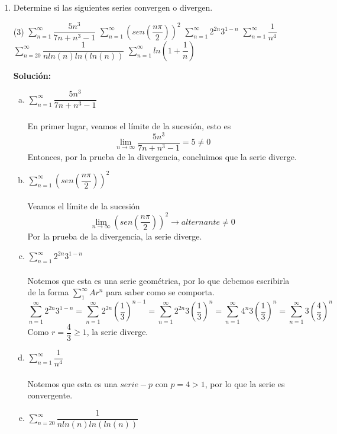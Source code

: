 \documentclass[12pt]{article}
\newenvironment{solucion}
{\begin{mdframed}[backgroundcolor=black!10]
		{\bf Solución:}\\
	}
	{
	\end{mdframed}
}
\newenvironment{preguntas}
{\begin{enumerate}\itemsep12pt
	}
	{
	\end{enumerate}
}
\newcommand{\ra}{\rightarrow}
\begin{document}
\begin{preguntas}
\item Determine si las siguientes series convergen o divergen.
\begin{tasks}(3)
\task $\sum\limits_{n=1}^{\infty}\dfrac{5n^3}{7n+n^3-1}$
\task $\sum\limits_{n=1}^{\infty}\left(sen\left(\dfrac{n\pi}{2}\right)\right)^2$
\task $\sum\limits_{n=1}^{\infty}2^{2n}3^{1-n}$
\task $\sum\limits_{n=1}^{\infty}\dfrac{1}{n^4}$
\task $\sum\limits_{n=20}^{\infty}\dfrac{1}{nln(n)ln(ln(n))}$
\task $\sum\limits_{n=1}^{\infty}ln\left(1+\dfrac{1}{n}\right)$
\end{tasks}
\begin{solucion}

\begin{enumerate}[a)]
\item $\sum\limits_{n=1}^{\infty}\dfrac{5n^3}{7n+n^3-1}$\\
			\\
			En primer lugar, veamos el límite de la sucesión, esto es
			$$\lim\limits_{n\ra \infty} \dfrac{5n^3}{7n+n^3-1} = 5 \neq 0$$
			Entonces, por la prueba de la divergencia, concluimos que la serie diverge.
\item $\sum\limits_{n=1}^{\infty}\left(sen\left(\dfrac{n\pi}{2}\right)\right)^2$\\
			\\
			Veamos el límite de la sucesión
			$$\lim\limits_{n\ra \infty} \left(sen\left(\dfrac{n\pi}{2}\right)\right)^2 \ra alternante \neq 0$$
			Por la prueba de la divergencia, la serie diverge.
\item $\sum\limits_{n=1}^{\infty}2^{2n}3^{1-n}$\\
			\\
			Notemos que esta es una serie geométrica, por lo que debemos escribirla de la forma $\sum\limits_1^{\infty} Ar^n$ para saber como se comporta.
			$$\sum\limits_{n=1}^{\infty}2^{2n}3^{1-n}
			= \sum\limits_{n=1}^{\infty}2^{2n}\left(\dfrac{1}{3}\right)^{n-1}
			= \sum\limits_{n=1}^{\infty}2^{2n}3\left(\dfrac{1}{3}\right)^n
			= \sum\limits_{n=1}^{\infty}4^{n}3\left(\dfrac{1}{3}\right)^n
			= \sum\limits_{n=1}^{\infty}3\left(\dfrac{4}{3}\right)^n$$
			Como $r = \dfrac{4}{3} \geq 1$, la serie diverge.
\item $\sum\limits_{n=1}^{\infty}\dfrac{1}{n^4}$\\
			\\
			Notemos que esta es una $serie-p$ con $p=4>1$, por lo que la serie es convergente.
\item $\sum\limits_{n=20}^{\infty}\dfrac{1}{nln(n)ln(ln(n))}$\\

\end{enumerate}
\end{solucion}
\end{preguntas}
\end{document}
